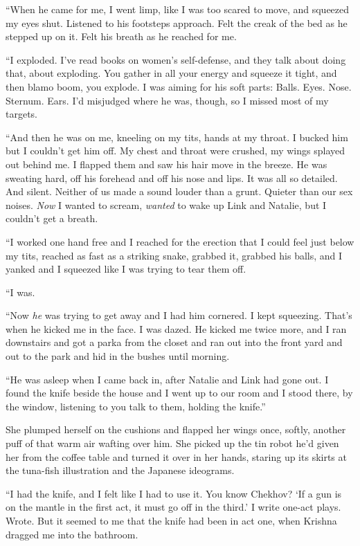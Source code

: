 ``When he came for me, I went limp, like I was too scared to move, and
squeezed my eyes shut.  Listened to his footsteps approach.  Felt the
creak of the bed as he stepped up on it.  Felt his breath as he
reached for me.

``I exploded.  I've read books on women's self-defense, and they talk
about doing that, about exploding.  You gather in all your energy and
squeeze it tight, and then blamo boom, you explode.  I was aiming for
his soft parts:  Balls.  Eyes.  Nose.  Sternum.  Ears.  I'd misjudged
where he was, though, so I missed most of my targets.

``And then he was on me, kneeling on my tits, hands at my throat.  I
bucked him but I couldn't get him off.  My chest and throat were
crushed, my wings splayed out behind me.  I flapped them and saw his
hair move in the breeze.  He was sweating hard, off his forehead and
off his nose and lips.  It was all so detailed.  And silent.  Neither
of us made a sound louder than a grunt.  Quieter than our sex noises. 
\textit{Now} I wanted to scream, \textit{wanted} to wake up Link and
Natalie, but I couldn't get a breath.

``I worked one hand free and I reached for the erection that I could
feel just below my tits, reached as fast as a striking snake, grabbed
it, grabbed his balls, and I yanked and I squeezed like I was trying
to tear them off.

``I was.

``Now \textit{he} was trying to get away and I had him cornered.  I
kept squeezing.  That's when he kicked me in the face.  I was dazed. 
He kicked me twice more, and I ran downstairs and got a parka from the
closet and ran out into the front yard and out to the park and hid in
the bushes until morning.

``He was asleep when I came back in, after Natalie and Link had gone
out.  I found the knife beside the house and I went up to our room and
I stood there, by the window, listening to you talk to them, holding
the knife.''

She plumped herself on the cushions and flapped her wings once,
softly, another puff of that warm air wafting over him.  She picked up
the tin robot he'd given her from the coffee table and turned it over
in her hands, staring up its skirts at the tuna-fish illustration and
the Japanese ideograms.

``I had the knife, and I felt like I had to use it.  You know Chekhov? 
`If a gun is on the mantle in the first act, it must go off in the
third.' I write one-act plays.  Wrote.  But it seemed to me that the
knife had been in act one, when Krishna dragged me into the bathroom.

